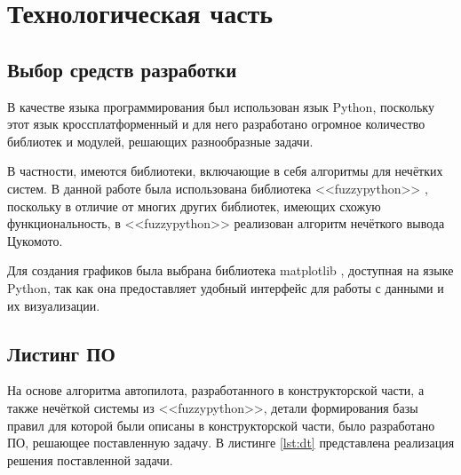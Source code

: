 \documentclass[12pt]{report}
\begin{document}
\chapter{Технологическая часть}

\section{Выбор средств разработки}
В качестве языка программирования был использован язык Python, поскольку этот язык кроссплатформенный и для него разработано огромное количество библиотек и модулей, решающих разнообразные задачи. 

В частности, имеются библиотеки, включающие в себя алгоритмы для нечётких систем. 
В данной работе была использована библиотека <<fuzzypython>> \cite{bib:2}, поскольку в отличие от многих других библиотек, имеющих схожую функциональность, в <<fuzzypython>> реализован алгоритм нечёткого вывода Цукомото.

Для создания графиков была выбрана библиотека matplotlib \cite{bib:14}, доступная на языке Python, так как она предоставляет удобный интерфейс для работы с данными и их визуализации.

\section{Листинг ПО}
На основе алгоритма автопилота, разработанного в конструкторской части, а также нечёткой системы из <<fuzzypython>>, детали формирования базы правил для которой были описаны в конструкторской части, было разработано ПО, решающее поставленную задачу. 
В листинге \ref{lst:dt} представлена реализация решения поставленной задачи.
\end{document}
